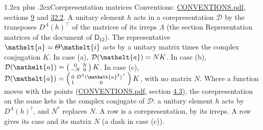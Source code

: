\documentclass[10pt,a4paper]{article}
\makeatletter
\renewcommand\section{\@startsection{section}{1}{\z@}{-3ex plus -1ex minus -.2ex}%
  {1.2ex plus .2ex}{\normalfont\large\sffamily\bfseries\color{parttitle}}}
\numberwithin{equation}{section}
\newcommand{\eltfont}[1]{{\let\sigma\eltsigma\mathelt{#1}}}
\newcommand{\grp}[1]{\mathsf{#1}}
\newcommand{\elt}[1]{\eltfont{#1}}
\makeatother
\begin{document}
\section{Corepresentation matrices}\label{s:corep_matrices}
Conventions: \href{../../CONVENTIONS.pdf}{CONVENTIONS.pdf}, sections \href{../../../rotation/CONVENTIONS.pdf\#conv.9}{9} and \href{../../CONVENTIONS.pdf\#conv.32.2}{32.2}.
A unitary element $h$ acts in a corepresentation $\mathcal{D}$ by the transposes $D^{\Lambda}(h)^{\top}$ of the matrices of its irreps $\Lambda$ (the section Representation matrices of the document of \href{../../../rotation/data/pdf/D12.pdf}{$\grp{D_{12}}$}). The representative $\elt{a} = \varTheta\elt{i}$ acts by a unitary matrix times the complex conjugation $K$.
In case (a), $\mathcal{D}(\elt{a}) = NK$. In case (b), $\mathcal{D}(\elt{a}) = \left(\begin{smallmatrix} 0 & N \\ -N & 0 \end{smallmatrix}\right) K$. In case (c), $\mathcal{D}(\elt{a}) = \left(\begin{smallmatrix} 0 & D^{\Lambda}(\elt{a}^2)^{\top} \\ 1 & 0 \end{smallmatrix}\right) K$, with no matrix $N$.
Where a function moves with the points (\href{../../CONVENTIONS.pdf}{CONVENTIONS.pdf}, section \href{../../../rotation/CONVENTIONS.pdf\#conv.4.3}{4.3}), the corepresentation on the same kets is the complex conjugate of $\mathcal{D}$: a unitary element $h$ acts by $D^{\Lambda}(h)^{\dagger}$, and $N^{*}$ replaces $N$.
A row is a corepresentation, by its irreps. A row gives its case and its matrix $N$ (a dash in case (c)).
\end{document}
